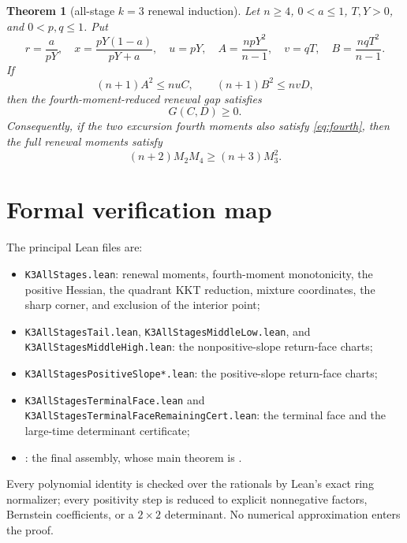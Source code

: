 \documentclass[11pt]{article}
\newtheorem{theorem}{Theorem}
\begin{document}
\begin{theorem}[all-stage $k=3$ renewal induction]
Let $n\ge4$, $0<a\le1$, $T,Y>0$, and $0<p,q\le1$.  Put
\[
 r=\frac{a}{pY},\quad x=\frac{pY(1-a)}{pY+a},\quad
 u=pY,\quad A=\frac{npY^2}{n-1},\quad
 v=qT,\quad B=\frac{nqT^2}{n-1}.
\]
If
\[
 (n+1)A^2\le nuC,\qquad (n+1)B^2\le nvD,
\]
then the fourth-moment-reduced renewal gap satisfies
\[
 G(C,D)\ge0.
\]
Consequently, if the two excursion fourth moments also satisfy
\eqref{eq:fourth}, then the full renewal moments satisfy
\[
 (n+2)M_2M_4\ge(n+3)M_3^2.
\]
\end{theorem}

\section{Formal verification map}

The principal Lean files are:
\begin{itemize}
\item \texttt{K3AllStages.lean}: renewal moments, fourth-moment monotonicity,
the positive Hessian, the quadrant KKT reduction, mixture coordinates, the
sharp corner, and exclusion of the interior point;
\item \texttt{K3AllStagesTail.lean}, \texttt{K3AllStagesMiddleLow.lean}, and
\texttt{K3AllStagesMiddleHigh.lean}: the nonpositive-slope return-face charts;
\item \texttt{K3AllStagesPositiveSlope*.lean}: the positive-slope return-face
charts;
\item \texttt{K3AllStagesTerminalFace.lean} and
\texttt{K3AllStagesTerminalFaceRemainingCert.lean}: the terminal face and the
large-time determinant certificate;
\item {}: the final assembly, whose main theorem
is .
\end{itemize}
Every polynomial identity is checked over the rationals by Lean's exact ring
normalizer; every positivity step is reduced to explicit nonnegative factors,
Bernstein coefficients, or a $2\times2$ determinant.  No numerical
approximation enters the proof.
\end{document}
